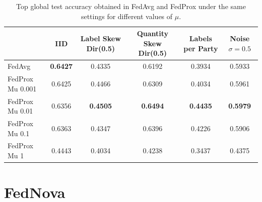 \begin{table}[h]
    \centering
    \begin{tabular}{lccccc}
        \toprule
        & IID & Label Skew Dir(0.5) & Quantity Skew Dir(0.5) & Labels per Party & Noise $\sigma = 0.5$ \\
        \midrule
        FedAvg & \textbf{0.6427} & 0.4335 & 0.6192 & 0.3934 & 0.5933 \\
        FedProx Mu 0.001 & 0.6425 & 0.4466 & 0.6309 & 0.4034 & 0.5961 \\
        FedProx Mu 0.01 & 0.6356 & \textbf{0.4505} & \textbf{0.6494} & \textbf{0.4435} & \textbf{0.5979} \\
        FedProx Mu 0.1 & 0.6363 & 0.4347 & 0.6396 & 0.4226 & 0.5906 \\
        FedProx Mu 1 & 0.4443 & 0.4034 & 0.4238 & 0.3437 & 0.4375 \\
        \bottomrule
    \end{tabular}
    \caption{Top global test accuracy obtained in FedAvg and FedProx under the same settings for different values of $\mu$.}
    \label{tab:accuracy}
\end{table}

\section{FedNova}

